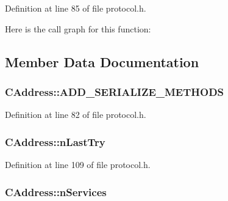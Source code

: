 Definition at line 85 of file protocol.\+h.



Here is the call graph for this function\+:




\subsection{Member Data Documentation}
\hypertarget{class_c_address_a9582fc22433b2ed275d4b65fb72551e7}{}
\subsubsection[{A\+D\+D\+\_\+\+S\+E\+R\+I\+A\+L\+I\+Z\+E\+\_\+\+M\+E\+T\+H\+O\+D\+S}]{\setlength{\rightskip}{0pt plus 5cm}C\+Address\+::\+A\+D\+D\+\_\+\+S\+E\+R\+I\+A\+L\+I\+Z\+E\+\_\+\+M\+E\+T\+H\+O\+D\+S}\label{class_c_address_a9582fc22433b2ed275d4b65fb72551e7}


Definition at line 82 of file protocol.\+h.

\hypertarget{class_c_address_abcf198429efe135fa2424f7dbc0048b0}{}
\subsubsection[{n\+Last\+Try}]{ C\+Address\+::n\+Last\+Try}\label{class_c_address_abcf198429efe135fa2424f7dbc0048b0}


Definition at line 109 of file protocol.\+h.

\hypertarget{class_c_address_a6a4a6aa020d0d558f238c7d04dd986c3}{}
\subsubsection[{n\+Services}]{ C\+Address\+::n\+Services}\label{class_c_address_a6a4a6aa020d0d558f238c7d04dd986c3}


